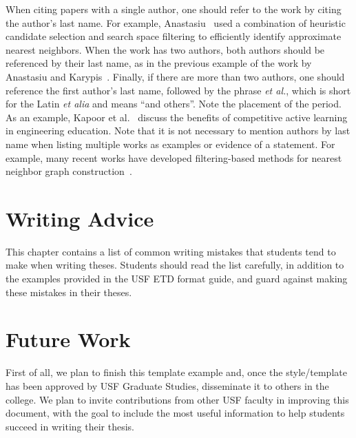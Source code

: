 When citing papers with a single author, one should refer to the work by citing the author's last name. For example, Anastasiu~\cite{anastasiu-idsc2017} used a combination of heuristic candidate selection and search space filtering to efficiently identify approximate nearest neighbors. When the work has two authors, both authors should be referenced by their last name, as in the previous example of the work by Anastasiu and Karypis~\cite{anastasiu-dsaa2016}. Finally, if there are more than two authors, one should reference the first author's last name, followed by the phrase \textit{et al.}, which is short for the Latin \textit{et alia} and means ``and others''. Note the placement of the period. As an example, Kapoor et al.~\cite{kapoor-fie2018} discuss the benefits of competitive active learning in engineering education. Note that it is not necessary to mention authors by last name when listing multiple works as examples or evidence of a statement. For example, many recent works have developed filtering-based methods for nearest neighbor graph construction~\cite{anastasiu-icde2014, anastasiu2015, anastasiu-sc2015, anastasiu-sc2016}.


\section{Writing Advice}\label{sec:writing}

This chapter contains a list of common writing mistakes that students tend to make when writing theses. Students should read the list carefully, in addition to the examples provided in the USF ETD format guide, and guard against making these mistakes in their theses.


\section{Future Work}\label{sec:future_work}

First of all, we plan to finish this template example and, once the style/template has been approved by USF Graduate Studies, disseminate it to others in the college. We plan to invite contributions from other USF faculty in improving this document, with the goal to include the most useful information to help students succeed in writing their thesis.


